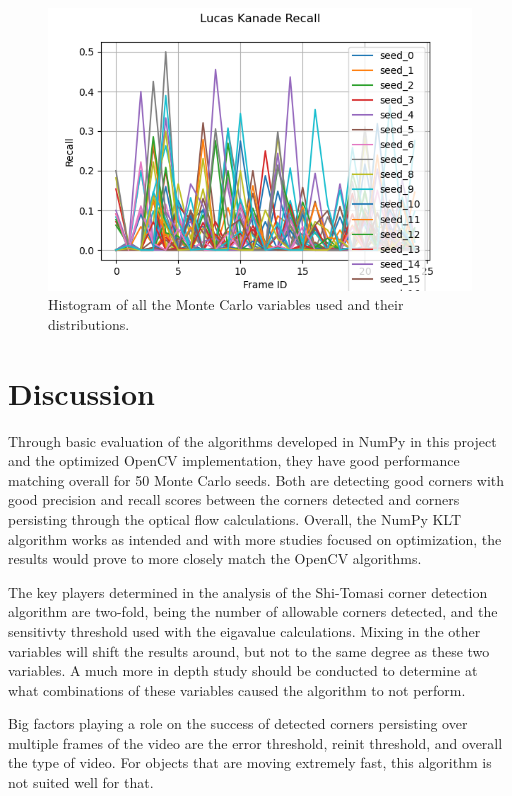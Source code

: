 \documentclass[11pt, conference, letterpaper]{IEEEtran}
\begin{document}
\begin{figure}[h]
    \centering
    \includegraphics[width=\linewidth]{mc_images/mc_lk_recall.png}
    \caption{Histogram of all the Monte Carlo variables used and their distributions.}
    \label{fig:mc_lk_rec}
\end{figure}

\section{Discussion}
Through basic evaluation of the algorithms developed in NumPy in this project and the optimized OpenCV implementation, they have good performance matching overall for 50 Monte Carlo seeds. Both are detecting good corners with good precision and recall scores between the corners detected and corners persisting through the optical flow calculations. Overall, the NumPy KLT algorithm works as intended and with more studies focused on optimization, the results would prove to more closely match the OpenCV algorithms.

The key players determined in the analysis of the Shi-Tomasi corner detection algorithm are two-fold, being the number of allowable corners detected, and the sensitivty threshold used with the eigavalue calculations. Mixing in the other variables will shift the results around, but not to the same degree as these two variables. A much more in depth study should be conducted to determine at what combinations of these variables caused the algorithm to not perform.

Big factors playing a role on the success of detected corners persisting over multiple frames of the video are the error threshold, reinit threshold, and overall the type of video. For objects that are moving extremely fast, this algorithm is not suited well for that.
\end{document}

